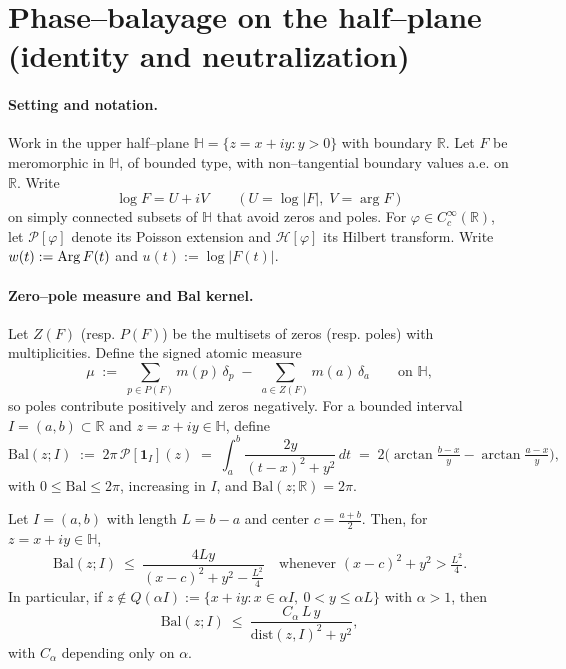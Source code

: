 
\section*{Phase--balayage on the half--plane (identity and neutralization)}

\paragraph{Setting and notation.}
Work in the upper half--plane $\mathbb{H}=\{z=x+iy:y>0\}$ with boundary $\mathbb{R}$. Let $F$ be meromorphic in $\mathbb{H}$, of bounded type, with non--tangential boundary values a.e. on $\mathbb{R}$. Write
\[
\log F = U+iV \qquad (U=\log|F|,\; V=\arg F)
\]
on simply connected subsets of $\mathbb{H}$ that avoid zeros and poles. For $\varphi\in C_c^\infty(\mathbb{R})$, let $\mathcal{P}[\varphi]$ denote its Poisson extension and $\mathcal H[\varphi]$ its Hilbert transform. Write $w(t):=\operatorname{Arg} F(t)$ and $u(t):=\log|F(t)|$.

\paragraph{Zero--pole measure and Bal kernel.}
Let $Z(F)$ (resp. $P(F)$) be the multisets of zeros (resp. poles) with multiplicities. Define the signed atomic measure
\[
\mu\;:=\;\sum_{p\in P(F)} m(p)\,\delta_p\;-
\;\sum_{a\in Z(F)} m(a)\,\delta_a\qquad\text{on }\mathbb{H},
\]
so poles contribute positively and zeros negatively. For a bounded interval $I=(a,b)\subset\mathbb{R}$ and $z=x+iy\in\mathbb{H}$, define
\[
\mathrm{Bal}(z;I)\;:=\;2\pi\,\mathcal{P}[\mathbf{1}_I](z)
\;=\;\int_{a}^{b}\frac{2y}{(t-x)^2+y^2}\,dt
\;=\;2\Big(\arctan\tfrac{b-x}{y}-\arctan\tfrac{a-x}{y}\Big),
\]
with $0\le \mathrm{Bal}\le 2\pi$, increasing in $I$, and $\mathrm{Bal}(z;\mathbb{R})=2\pi$.

\begin{lemma}\label{lem:farfield}
Let $I=(a,b)$ with length $L=b-a$ and center $c=\tfrac{a+b}{2}$. Then, for $z=x+iy\in\mathbb{H}$,
\[
\mathrm{Bal}(z;I)\ \le\ \frac{4Ly}{(x-c)^2+y^2-\tfrac{L^2}{4}}\quad\text{whenever }(x-c)^2+y^2>\tfrac{L^2}{4}.
\]
In particular, if $z\notin Q(\alpha I):=\{x+iy: x\in \alpha I,\ 0<y\le \alpha L\}$ with $\alpha>1$, then
\[
\mathrm{Bal}(z;I)\ \le\ \frac{C_\alpha\,L\,y}{\mathrm{dist}(z,I)^2+y^2},
\]
with $C_\alpha$ depending only on $\alpha$.
\end{lemma}

